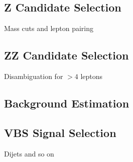\subsection{Z Candidate Selection}\label{sec:zSelection}
Mass cuts and lepton pairing


\subsection{ZZ Candidate Selection}
Disambiguation for $>4$ leptons


\subsection{Background Estimation}


\subsection{VBS Signal Selection}\label{sec:vbsSelection}
Dijets and so on
